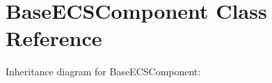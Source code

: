 \hypertarget{classBaseECSComponent}{}\section{Base\+E\+C\+S\+Component Class Reference}
\label{classBaseECSComponent}


Inheritance diagram for Base\+E\+C\+S\+Component\+:
